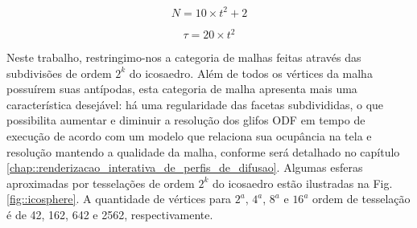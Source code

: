 \documentclass[
    12pt,                %
    oneside,            %
    a4paper,            %
    english,            %
    french,                %
    spanish,            %
    brazil                %
    ]{abntex2}
\begin{document}
\begin{equation}
\label{eq::icosa_samples}
    N = 10\times t^2 + 2
\end{equation}

\begin{equation}
\label{eq::icosphere_triangulos}
\tau = 20\times t^2
\end{equation}










Neste trabalho, restringimo-nos a categoria de malhas feitas através das subdivisões de ordem $2^k$ do icosaedro. Além de todos os vértices da malha possuírem suas antípodas, esta categoria de malha apresenta mais uma característica desejável: há uma regularidade das facetas subdivididas, o que possibilita aumentar e diminuir a resolução dos glifos ODF em tempo de execução de acordo com um modelo que relaciona sua ocupância na tela e resolução mantendo a qualidade da malha, conforme será detalhado no capítulo \ref{chap::renderizacao_interativa_de_perfis_de_difusao}. Algumas esferas aproximadas por tesselações de ordem $2^k$ do icosaedro estão ilustradas na Fig. \ref{fig::icosphere}. A quantidade de vértices para $2^a$, $4^a$, $8^a$ e $16^a$ ordem de tesselação é de 42, 162, 642 e 2562, respectivamente.
\end{document}

